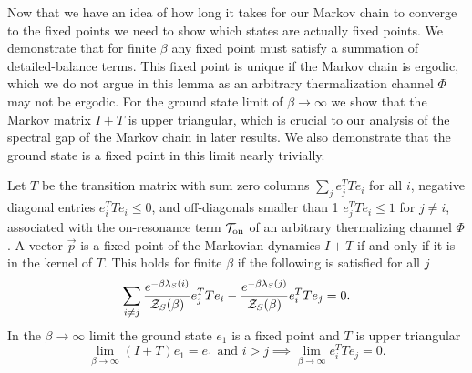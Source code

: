 Now that we have an idea of how long it takes for our Markov chain to converge to the fixed points we need to show which states are actually fixed points. We demonstrate that for finite $\beta$ any fixed point must satisfy a summation of detailed-balance terms. This fixed point is unique if the Markov chain is ergodic, which we do not argue in this lemma as an arbitrary thermalization channel $\Phi$ may not be ergodic. For the ground state limit of $\beta \to \infty$ we show that the Markov matrix $I + T$ is upper triangular, which is crucial to our analysis of the spectral gap of the Markov chain in later results. We also demonstrate that the ground state is a fixed point in this limit nearly trivially.
\begin{lemma}\label{lem:fixed_point}
    Let $T$ be the transition matrix with sum zero columns $\sum_j e_j^T T e_i$ for all $i$, negative diagonal entries $e_i^T T e_i \leq 0$, and off-diagonals smaller than 1 $e_j^T T e_i \leq 1$ for $j \neq i$, associated with the on-resonance term $\mathcal{T}_{\rm on}$ of an arbitrary thermalizing channel $\Phi$. A vector $\vec{p}$ is a fixed point of the Markovian dynamics $I + T$ if and only if it is in the kernel of $T$. This holds for finite $\beta$ if the following is satisfied for all $j$
    \begin{equation}
        \sum_{i \neq j} \frac{e^{-\beta \lambda_S(i)}}{\mathcal{Z}_S(\beta)} e_j^T T e_i - \frac{e^{-\beta \lambda_S(j)}}{\mathcal{Z}_S(\beta)} e_i^T T e_j = 0.\label{eq:detailed_balance}
    \end{equation}
    In the $\beta \to \infty$ limit the ground state $e_1$ is a fixed point and $T$ is upper triangular
    \begin{equation}
        \lim_{\beta \to \infty} (I + T) e_1 = e_1 \text{ and }i > j \implies \lim_{\beta \to \infty} e_i^T T e_j = 0.
    \end{equation}
\end{lemma}
